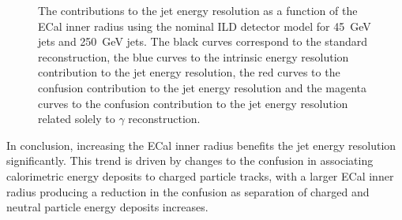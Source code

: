 \begin{figure}[h!]
\caption[The contributions to the jet energy resolution as a function of the ECal inner radius using the nominal ILD detector model for \protect{} 45~GeV jets and \protect{} 250~GeV jets.  The black curves correspond to the standard reconstruction, the blue curves to the intrinsic energy resolution contribution to the jet energy resolution, the red curves to the confusion contribution to the jet energy resolution and the magenta curves to the confusion contribution to the jet energy resolution related solely to $\gamma$ reconstruction.]{The contributions to the jet energy resolution as a function of the ECal inner radius using the nominal ILD detector model for \protect{} 45~GeV jets and \protect{} 250~GeV jets.  The black curves correspond to the standard reconstruction, the blue curves to the intrinsic energy resolution contribution to the jet energy resolution, the red curves to the confusion contribution to the jet energy resolution and the magenta curves to the confusion contribution to the jet energy resolution related solely to $\gamma$ reconstruction.}
\label{fig:ecalinnerrbreak}
\end{figure}

In conclusion, increasing the ECal inner radius benefits the jet energy resolution significantly.  This trend is driven by changes to the confusion in associating calorimetric energy deposits to charged particle tracks, with a larger ECal inner radius producing a reduction in the confusion as separation of charged and neutral particle energy deposits increases.  
